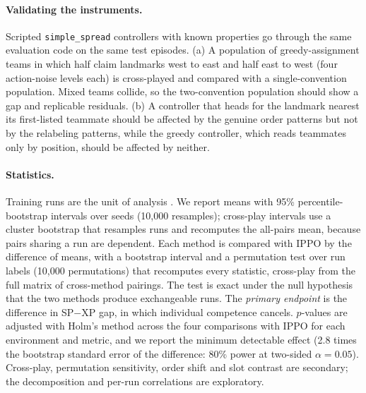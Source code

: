 \paragraph{Validating the instruments.}
Scripted \texttt{simple\_spread} controllers with known properties go through
the same evaluation code on the same test episodes. (a) A population of
greedy-assignment teams in which half claim landmarks west to east and half
east to west (four action-noise levels each) is cross-played and compared with
a single-convention population. Mixed teams collide, so the two-convention
population should show a gap and replicable residuals. (b) A controller that
heads for the landmark nearest its first-listed teammate should be affected by
the genuine order patterns but not by the relabeling patterns, while the
greedy controller, which reads teammates only by position, should be affected
by neither.

\paragraph{Statistics.}
Training runs are the unit of analysis \citep{henderson2018matters,agarwal2021precipice}.
We report means with 95\% percentile-bootstrap intervals over seeds (10{,}000
resamples); cross-play intervals use a cluster bootstrap that resamples runs and
recomputes the all-pairs mean, because pairs sharing a run are dependent.
Each method is compared with IPPO by the difference of means, with a bootstrap
interval and a permutation test over run labels (10{,}000 permutations) that
recomputes every statistic, cross-play from the full matrix of cross-method
pairings. The test is exact under the null hypothesis that the two methods
produce exchangeable runs. The \emph{primary endpoint} is the difference in
SP$-$XP gap, in which individual competence cancels. $p$-values are adjusted
with Holm's method \citep{holm1979simple} across the four comparisons with IPPO
for each environment and metric, and we report the minimum detectable effect
(2.8 times the bootstrap standard error of the difference: 80\% power at
two-sided $\alpha=0.05$). Cross-play, permutation sensitivity, order shift and
slot contrast are secondary; the decomposition and per-run correlations are
exploratory.


